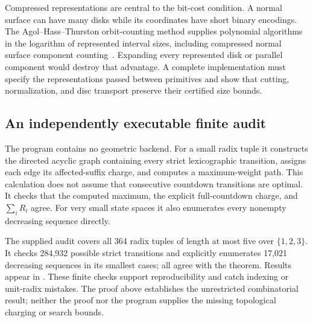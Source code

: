 Compressed representations are central to the bit-cost condition.  A normal
surface can have many disks while its coordinates have short binary encodings.
The Agol--Hass--Thurston orbit-counting method supplies polynomial algorithms
in the logarithm of represented interval sizes, including compressed normal
surface component counting~\cite{aht}.  Expanding every represented disk or
parallel component would destroy that advantage.  A complete implementation
must specify the representations passed between primitives and show that
cutting, normalization, and disc transport preserve their certified size
bounds.

\subsection{An independently executable finite audit}

The program  contains no geometric backend.
For a small radix tuple it constructs the directed acyclic graph containing
every strict lexicographic transition, assigns each edge its affected-suffix
charge, and computes a maximum-weight path.  This calculation does not assume
that consecutive countdown transitions are optimal.  It checks that the
computed maximum, the explicit full-countdown charge, and
$\sum_iR_i$ agree.  For very small state spaces it also enumerates every
nonempty decreasing sequence directly.

The supplied audit covers all 364 radix tuples of length at most five over
$\{1,2,3\}$.  It checks 284,932 possible strict transitions and explicitly
enumerates 17,021 decreasing sequences in its smallest cases; all agree with
the theorem.  Results appear in .
These finite checks support reproducibility and catch indexing or unit-radix
mistakes.  The proof above establishes the unrestricted combinatorial result;
neither the proof nor the program supplies the missing topological charging
or search bounds.
